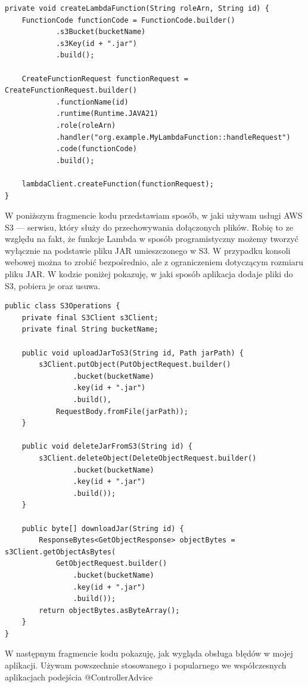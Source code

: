 \documentclass[runningheads,12pt]{llncs}
\begin{document}
\begin{verbatim}
private void createLambdaFunction(String roleArn, String id) {
    FunctionCode functionCode = FunctionCode.builder()
            .s3Bucket(bucketName)
            .s3Key(id + ".jar")
            .build();

    CreateFunctionRequest functionRequest = CreateFunctionRequest.builder()
            .functionName(id)
            .runtime(Runtime.JAVA21)
            .role(roleArn)
            .handler("org.example.MyLambdaFunction::handleRequest")
            .code(functionCode)
            .build();

    lambdaClient.createFunction(functionRequest);
}
\end{verbatim}

W poniższym fragmencie kodu przedstawiam sposób, w jaki używam usługi AWS S3 — serwisu, który służy do przechowywania dołączonych plików. Robię to ze względu na fakt, że funkcje Lambda w sposób programistyczny możemy tworzyć wyłącznie na podstawie pliku JAR umieszczonego w S3. W przypadku konsoli webowej można to zrobić bezpośrednio, ale z ograniczeniem dotyczącym rozmiaru pliku JAR. W kodzie poniżej pokazuję, w jaki sposób aplikacja dodaje pliki do S3, pobiera je oraz usuwa.

\begin{verbatim}
public class S3Operations {
    private final S3Client s3Client;
    private final String bucketName;

    public void uploadJarToS3(String id, Path jarPath) {
        s3Client.putObject(PutObjectRequest.builder()
                .bucket(bucketName)
                .key(id + ".jar")
                .build(),
            RequestBody.fromFile(jarPath));
    }

    public void deleteJarFromS3(String id) {
        s3Client.deleteObject(DeleteObjectRequest.builder()
                .bucket(bucketName)
                .key(id + ".jar")
                .build());
    }
    
    public byte[] downloadJar(String id) {
        ResponseBytes<GetObjectResponse> objectBytes = s3Client.getObjectAsBytes(
            GetObjectRequest.builder()
                .bucket(bucketName)
                .key(id + ".jar")
                .build());
        return objectBytes.asByteArray();
    }
}
\end{verbatim}

W następnym fragmencie kodu pokazuję, jak wygląda obsługa błędów w mojej aplikacji. Używam powszechnie stosowanego i popularnego we współczesnych aplikacjach podejścia @ControllerAdvice
\end{document}
